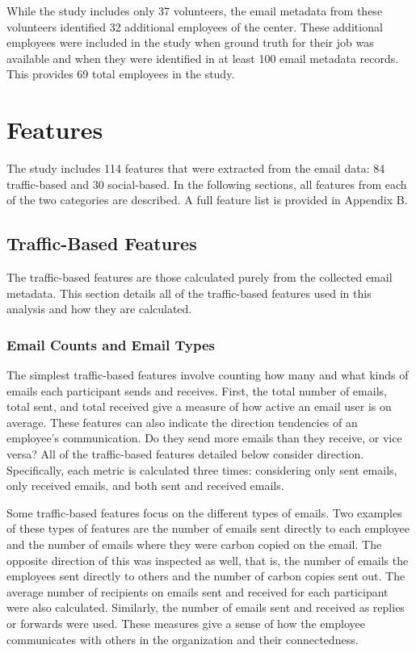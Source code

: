 \documentclass[12pt]{report}
\begin{document}
While the study includes only 37 volunteers, the email metadata from these volunteers identified 32 additional employees of the center.
These additional employees were included in the study when ground truth for their job was available and when they were identified in at least 100 email metadata records.
This provides 69 total employees in the study.

\section{Features}
The study includes 114 features that were extracted from the email data: 84 traffic-based and 30 social-based.
In the following sections, all features from each of the two categories are described. 
A full feature list is provided in Appendix B.

\subsection{Traffic-Based Features}
The traffic-based features are those calculated purely from the collected email metadata.
This section details all of the traffic-based features used in this analysis and how they are calculated. 

\subsubsection{Email Counts and Email Types}
The simplest traffic-based features involve counting how many and what kinds of emails each participant sends and receives.
First, the total number of emails, total sent, and total received give a measure of how active an email user is on average.
These features can also indicate the direction tendencies of an employee's communication. 
Do they send more emails than they receive, or vice versa?  All of the traffic-based features detailed below consider direction.
Specifically, each metric is calculated three times: considering only sent emails, only received emails, and both sent and received emails.

Some traffic-based features focus on the different types of emails.
Two examples of these types of features are the number of emails sent directly to each employee and the number of emails where they were carbon copied on the email.
The opposite direction of this was inspected as well, that is, the number of emails the employees sent directly to others and the number of carbon copies sent out.
The average number of recipients on emails sent and received for each participant were also calculated.
Similarly, the number of emails sent and received as replies or forwards were used.
These measures give a sense of how the employee communicates with others in the organization and their connectedness.
\end{document}
